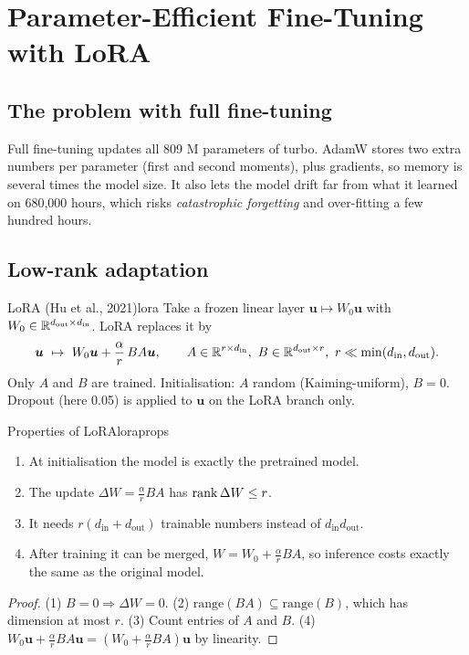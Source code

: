\chapter{Parameter-Efficient Fine-Tuning with LoRA}
\label{ch:lora}

\section{The problem with full fine-tuning}

Full fine-tuning updates all 809 M parameters of turbo. AdamW stores two extra numbers per parameter (first and second moments),
plus gradients, so memory is several times the model size. It also lets the model drift far from what it learned on 680{,}000 hours,
which risks \emph{catastrophic forgetting} and over-fitting a few hundred hours.

\section{Low-rank adaptation}

\begin{definition}{LoRA (Hu et al., 2021)}{lora}
Take a frozen linear layer $\bm u\mapsto W_0\bm u$ with $W_0\in\mathbb{R}^{d_{\text{out}}\times d_{\text{in}}}$. LoRA replaces it by
\[
\bm u\ \mapsto\ W_0\bm u+\frac{\alpha}{r}\,B A\bm u,\qquad A\in\mathbb{R}^{r\times d_{\text{in}}},\ B\in\mathbb{R}^{d_{\text{out}}\times r},\ r\ll\min(d_{\text{in}},d_{\text{out}}).
\]
Only $A$ and $B$ are trained. Initialisation: $A$ random (Kaiming-uniform), $B=0$. Dropout (here 0.05) is applied to $\bm u$ on the
LoRA branch only.
\end{definition}

\begin{proposition}{Properties of LoRA}{loraprops}
\begin{enumerate}
\item At initialisation the model is exactly the pretrained model.
\item The update $\Delta W=\frac{\alpha}{r}BA$ has $\operatorname{rank}\Delta W\le r$.
\item It needs $r(d_{\text{in}}+d_{\text{out}})$ trainable numbers instead of $d_{\text{in}}d_{\text{out}}$.
\item After training it can be merged, $W=W_0+\frac\alpha rBA$, so inference costs exactly the same as the original model.
\end{enumerate}
\end{proposition}
\begin{proof}
(1) $B=0\Rightarrow\Delta W=0$. (2) $\mathrm{range}(BA)\subseteq\mathrm{range}(B)$, which has dimension at most $r$.
(3) Count entries of $A$ and $B$. (4) $W_0\bm u+\frac\alpha rBA\bm u=(W_0+\frac\alpha rBA)\bm u$ by linearity.
\end{proof}

